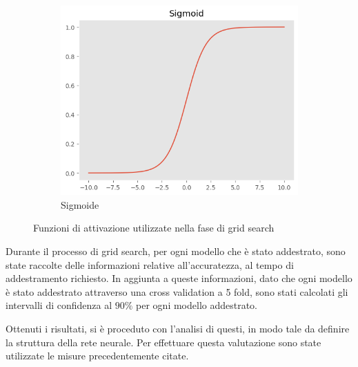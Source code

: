 \begin{figure}[!ht]
    \hfill
    \begin{subfigure}[b]{0.3\textwidth}
        \centering
        \includegraphics[width=\textwidth]{img/rete/sigmoid.png}
        \caption{Sigmoide}
        \label{fig:sigmoid}
    \end{subfigure}
    \caption{Funzioni di attivazione utilizzate nella fase di grid search}
    \label{fig:}
\end{figure}

Durante il processo di grid search, per ogni modello che è stato addestrato, sono
state raccolte delle informazioni relative all'accuratezza, al tempo di addestramento
richiesto. In aggiunta a queste informazioni, dato che ogni modello è stato
addestrato attraverso una cross validation a 5 fold, sono stati calcolati gli
intervalli di confidenza al $90\%$ per ogni modello addestrato.

Ottenuti i risultati, si è proceduto con l'analisi di questi, in modo tale da
definire la struttura della rete neurale. Per effettuare questa valutazione sono
state utilizzate le misure precedentemente citate.

